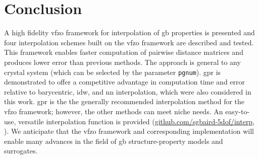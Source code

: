 \documentclass[preprint,12pt]{elsarticle}
\begin{document}
\begin{figure}
{    %
    }
    \label{fig:runtime}
\end{figure}

\section{Conclusion} \label{sec:conclusion}

A high fidelity \gls{vfzo} framework for interpolation of \gls{gb} properties is presented and four interpolation schemes built on the \gls{vfzo} framework are described and tested. This framework enables faster computation of pairwise distance matrices and produces lower error than previous methods.
The approach is general to any crystal system (which can be selected by the parameter \texttt{pgnum}). \Gls{gpr} is demonstrated to offer a competitive advantage in computation time and error relative to barycentric, \gls{idw}, and \gls{nn} interpolation, which were also considered in this work. \Gls{gpr} is the the generally recommended interpolation method for the \gls{vfzo} framework; however, the other methods can meet niche needs. An easy-to-use, versatile interpolation function is provided (\url{github.com/sgbaird-5dof/interp}, \cite{bairdFiveDegreeofFreedom5DOF2020}). We anticipate that the \gls{vfzo} framework and corresponding implementation will enable many advances in the field of \gls{gb} structure-property models and surrogates.
    
\end{document}
